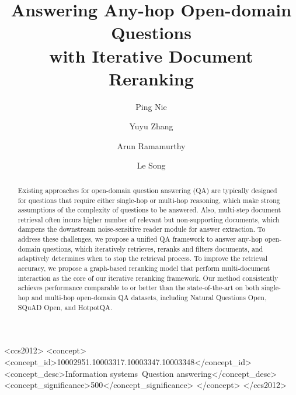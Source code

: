 \documentclass[sigconf]{acmart}
\begin{document}
\fancyhead{}

\title{Answering Any-hop Open-domain Questions \\ with Iterative Document Reranking}

\author{Ping Nie}

\author{Yuyu Zhang}
\authornotemark[1]

\author{Arun Ramamurthy}

\author{Le Song}






















\begin{abstract}
Existing approaches for open-domain question answering (QA) are typically designed for questions that require either single-hop or multi-hop reasoning, which make strong assumptions of the complexity of questions to be answered. Also, multi-step document retrieval often incurs higher number of relevant but non-supporting documents, which dampens the downstream noise-sensitive reader module for answer extraction. To address these challenges, we propose a unified QA framework to answer any-hop open-domain questions, which iteratively retrieves, reranks and filters documents, and adaptively determines when to stop the retrieval process. To improve the retrieval accuracy, we propose a graph-based reranking model that perform multi-document interaction as the core of our iterative reranking framework. Our method consistently achieves performance comparable to or better than the state-of-the-art on both single-hop and multi-hop open-domain QA datasets, including Natural Questions Open, SQuAD Open, and HotpotQA.
\end{abstract}

\begin{CCSXML}
<ccs2012>
   <concept>
       <concept_id>10002951.10003317.10003347.10003348</concept_id>
       <concept_desc>Information systems~Question answering</concept_desc>
       <concept_significance>500</concept_significance>
       </concept>
 </ccs2012>
\end{CCSXML}
\end{document}

